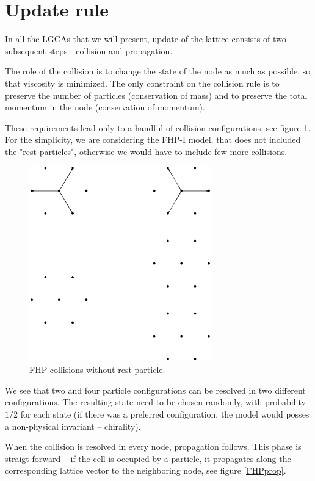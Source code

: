 \section{Update rule}
In all the LGCAs that we will present, update of the lattice consists of two subsequent steps - collision and propagation.

The role of the collision is to change the state of the node as much as possible, so that viscosity is minimized.
The only constraint on the collision rule is to preserve the number of particles (conservation of mass) and to preserve the total momentum in the node (conservation of momentum).

These requirements lead only to a handful of collision configurations, see figure \ref{FHPcol}. For the simplicity, we are considering the FHP-I model, that does not included the "rest particles", otherwise we would have to include few more collisions.

\begin{figure}[H]
 \centering
 \includegraphics[width=0.7\textwidth]{./img/FHPcol}
 \caption{FHP collisions without rest particle.}
 \label{FHPcol}
\end{figure}

We see that two and four particle configurations can be resolved in two different configurations. The resulting state need to be chosen randomly, with probability $1/2$ for each state (if there was a preferred configuration, the model would posses a non-physical invariant -- chirality).

When the collision is resolved in every node, propagation follows.
This phase is straigt-forward -- if the cell is occupied by a particle, it propagates along the corresponding lattice vector to the neighboring node, see figure \ref{FHPprop}.


